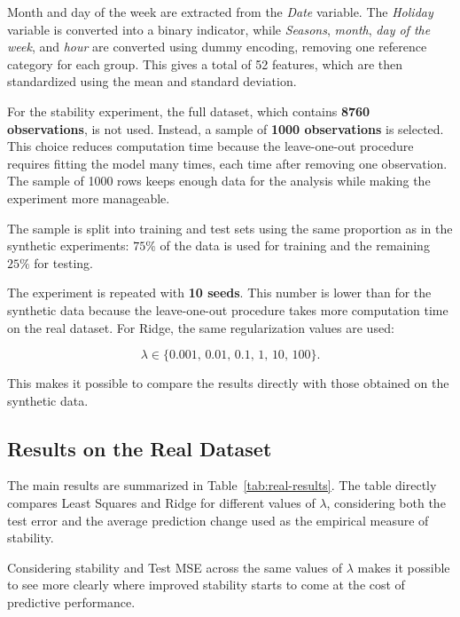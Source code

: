 \documentclass[11pt,a4paper]{article}
\begin{document}
Month and day of the week are extracted from the \emph{Date} variable. The \emph{Holiday} variable is converted into a binary indicator, while \emph{Seasons}, \emph{month}, \emph{day of the week}, and \emph{hour} are converted using dummy encoding, removing one reference category for each group. This gives a total of 52 features, which are then standardized using the mean and standard deviation.

For the stability experiment, the full dataset, which contains \textbf{8760 observations}, is not used. Instead, a sample of \textbf{1000 observations} is selected. This choice reduces computation time because the leave-one-out procedure requires fitting the model many times, each time after removing one observation. The sample of 1000 rows keeps enough data for the analysis while making the experiment more manageable.

The sample is split into training and test sets using the same proportion as in the synthetic experiments: $75\%$ of the data is used for training and the remaining $25\%$ for testing.

The experiment is repeated with \textbf{10 seeds}. This number is lower than for the synthetic data because the leave-one-out procedure takes more computation time on the real dataset. For Ridge, the same regularization values are used:

\begin{equation}
    \lambda \in \{0.001,\,0.01,\,0.1,\,1,\,10,\,100\}.
\end{equation}

This makes it possible to compare the results directly with those obtained on the synthetic data.

\subsection{Results on the Real Dataset}

The main results are summarized in Table~\ref{tab:real-results}. The table directly compares Least Squares and Ridge for different values of $\lambda$, considering both the test error and the average prediction change used as the empirical measure of stability.

Considering stability and Test MSE across the same values of $\lambda$ makes it possible to see more clearly where improved stability starts to come at the cost of predictive performance.
\end{document}
